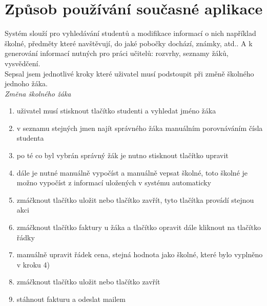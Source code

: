 \documentclass[a4paper, 11pt, twocolumn]{article}
\begin{document}
	\section*{\large{Způsob používání současné aplikace}}
	\vspace*{-0.2cm}
	Systém slouží pro vyhledávání studentů a modifikace informací o nich například školné, předměty které navštěvují, do jaké pobočky dochází, známky, 
	atd.. A k generování informací nutných pro práci učitelů: rozvrhy, seznamy žáků, vysvědčení. \\

   	\noindent Sepsal jsem jednotlivé kroky které uživatel musí podstoupit při změně školného jednoho žáka. \\

   	\textit{Změna školného žáka}
	\vspace*{-0.2cm}

   	\begin{enumerate}
        \item  uživatel musí stisknout tlačítko studenti a vyhledat jméno žáka
        \vspace*{-0.2cm}
        \item  v seznamu stejných jmen najít správného žáka manuálním porovnáváním čísla studenta
        \vspace*{-0.2cm}
        \item  po té co byl vybrán správný žák je nutno stisknout tlačítko upravit
        \vspace*{-0.2cm}
        \item  dále je nutné manuálně vypočíst a manuálně vepsat školné, toto školné je možno vypočíst z informací uložených v systému automaticky
        \vspace*{-0.2cm}
        \item  zmáčknout tlačítko uložit nebo tlačítko zavřít, tyto tlačítka provádí stejnou akci
        \vspace*{-0.2cm}
        \item  zmáčknout tlačítko faktury u žáka a tlačítko opravit dále kliknout na tlačítko řádky
        \vspace*{-0.2cm}
        \item  manuálně upravit řádek cena, stejná hodnota jako školné, které bylo vyplněno v kroku 4)
        \vspace*{-0.2cm}
        \item  zmáčknout tlačítko uložit nebo tlačítko zavřít
        \vspace*{-0.2cm}
        \item  stáhnout fakturu a odeslat mailem
        \vspace*{-0.2cm}
   	\end{enumerate}
	
\end{document}

